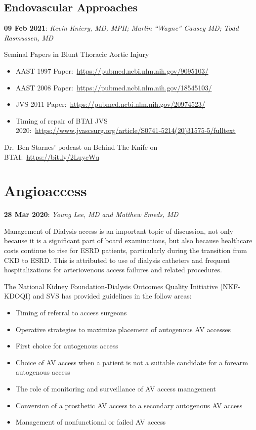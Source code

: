 \documentclass[
]{book}
\begin{document}
\hypertarget{endovascular-approaches}{%
\section{Endovascular Approaches}\label{endovascular-approaches}}

\textbf{09 Feb 2021}: \emph{Kevin Kniery, MD, MPH; Marlin ``Wayne'' Causey MD; Todd
Rasmussen, MD}

Seminal Papers in Blunt Thoracic Aortic Injury

\begin{itemize}
\item
  AAST 1997 Paper:~\url{https://pubmed.ncbi.nlm.nih.gov/9095103/}
\item
  AAST 2008 Paper:~\url{https://pubmed.ncbi.nlm.nih.gov/18545103/}
\item
  JVS 2011 Paper:~\url{https://pubmed.ncbi.nlm.nih.gov/20974523/}
\item
  Timing of repair of BTAI JVS
  2020:~\url{https://www.jvascsurg.org/article/S0741-5214(20)31575-5/fulltext}
\end{itemize}

Dr.~Ben Starnes' podcast on Behind The Knife on
BTAI:~\url{https://bit.ly/2LuycWq}

\hypertarget{angioaccess}{%
\chapter{Angioaccess}\label{angioaccess}}

\textbf{28 Mar 2020}: \emph{Young Lee, MD and Matthew Smeds, MD}

Management of Dialysis access is an important topic of discussion, not
only because it is a significant part of board examinations, but also
because healthcare costs continue to rise for ESRD patients,
particularly during the transition from CKD to ESRD. This is attributed
to use of dialysis catheters and frequent hospitalizations for
arteriovenous access failures and related procedures.

The National Kidney Foundation-Dialysis Outcomes Quality Initiative
(NKF-KDOQI) and SVS has provided guidelines in the follow areas:

\begin{itemize}
\item
  Timing of referral to access surgeons
\item
  Operative strategies to maximize placement of autogenous AV accesses
\item
  First choice for autogenous access
\item
  Choice of AV access when a patient is not a suitable candidate for a
  forearm autogenous access
\item
  The role of monitoring and surveillance of AV access management
\item
  Conversion of a prosthetic AV access to a secondary autogenous AV
  access
\item
  Management of nonfunctional or failed AV access
\end{itemize}
\end{document}

